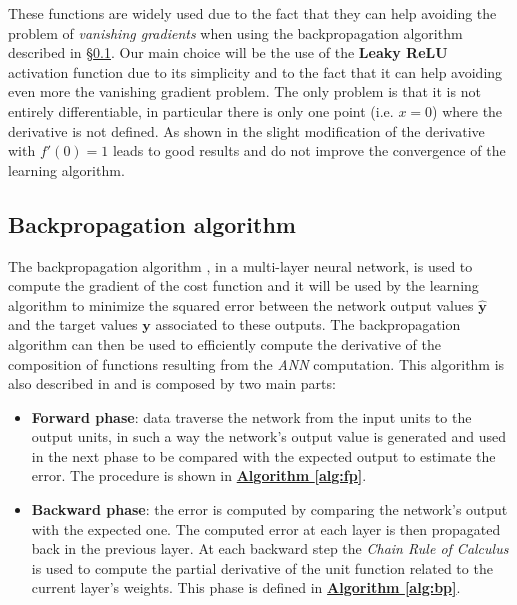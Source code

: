 These functions are widely used due to the fact that they can help avoiding the problem of \textit{vanishing gradients} when using the backpropagation algorithm described in \S\ref{backprop}. Our main choice will be the use of the \textbf{Leaky ReLU} activation function due to its simplicity and to the fact that it can help avoiding even more the vanishing gradient problem. The only problem is that it is not entirely differentiable, in particular there is only one point (i.e. $x=0$) where the derivative is not defined. As shown in \parencite[Chap. 6.3]{bengio} the slight modification of the derivative with \textit{$f'(0) = 1$} leads to good results and do not improve the convergence of the learning algorithm.

\subsection{Backpropagation algorithm}
\label{backprop}
The backpropagation algorithm \parencite[see][Chap. 6.5]{bengio}, in a multi-layer neural network, is used to compute the gradient of the cost function and it will be used by the learning algorithm to minimize the squared error between the network output values $\hat{\textbf{y}}$ and the target values $\textbf{y}$ associated to these outputs. The backpropagation algorithm can then be used to efficiently compute the derivative of the composition of functions resulting from the \textit{ANN} computation.\newline
This algorithm is also described in \cite{MLmitchell} and is composed by two main parts:
\begin{itemize}
    \item \textbf{Forward phase}: data traverse the network from the input units to the output units, in such a way the network's output value is generated and used in the next phase to be compared with the expected output to estimate the error. The procedure is shown in \hyperref[alg:fp]{\textbf{Algorithm \ref{alg:fp}}}.
    \item \textbf{Backward phase}: the error is computed by comparing the network's output with the expected one. The computed error at each layer is then propagated back in the previous layer. At each backward step the \textit{Chain Rule of Calculus} is used to compute the partial derivative of the unit function related to the current layer's weights. This phase is defined in \hyperref[alg:bp]{\textbf{Algorithm \ref{alg:bp}}}.
\end{itemize}

